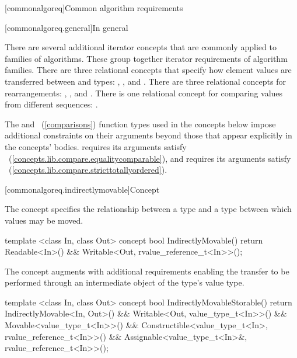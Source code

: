 [commonalgoreq]{Common algorithm requirements}

[commonalgoreq.general]{In general}

\pnum
There are several additional iterator concepts that are commonly applied to families of algorithms.
These group together iterator requirements of algorithm families. There are three relational
concepts that specify how element values are transferred between  and  types:
, , and . There are three relational concepts
for rearrangements: , , and .
There is one relational concept for comparing values from different sequences: .

\pnum
\enternote The  and ~(\ref{comparisons}) function types used in the
concepts below impose additional constraints on their arguments beyond those that appear explicitly in the
concepts' bodies.  requires its arguments satisfy ~(\ref{concepts.lib.compare.equalitycomparable}),
and  requires its arguments satisfy ~(\ref{concepts.lib.compare.stricttotallyordered}).\exitnote

[commonalgoreq.indirectlymovable]{Concept }

\pnum
The  concept specifies the relationship between a 
type and a  type between which values may be moved.

%
\begin{codeblock}
  template <class In, class Out>
  concept bool IndirectlyMovable() {
    return Readable<In>() &&
      Writable<Out, rvalue_reference_t<In>>();
  }
\end{codeblock}

\pnum
The  concept augments  with additional
requirements enabling the transfer to be performed through an intermediate object of the
 type's value type.

%
\begin{codeblock}
  template <class In, class Out>
  concept bool IndirectlyMovableStorable() {
    return IndirectlyMovable<In, Out>() &&
      Writable<Out, value_type_t<In>>() &&
      Movable<value_type_t<In>>() &&
      Constructible<value_type_t<In>, rvalue_reference_t<In>>() &&
      Assignable<value_type_t<In>&, rvalue_reference_t<In>>();
  }
\end{codeblock}

